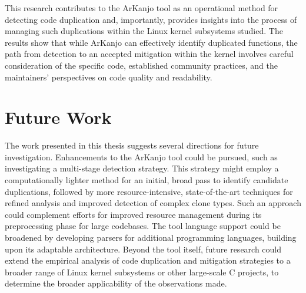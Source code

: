 This research contributes to the ArKanjo tool as an operational method for detecting code 
duplication and, importantly, provides insights into the process of managing such duplications 
within the Linux kernel subsystems studied. The results show that while ArKanjo can effectively 
identify duplicated functions, the path from detection to an accepted mitigation within the kernel 
involves careful consideration of the specific code, established community practices, and the 
maintainers' perspectives on code quality and readability.

\section{Future Work}

The work presented in this thesis suggests several directions for future investigation. Enhancements 
to the ArKanjo tool could be pursued, such as investigating a multi-stage detection strategy. 
This strategy might employ a computationally lighter method for an initial, broad pass to identify 
candidate duplications, followed by more resource-intensive, state-of-the-art techniques for refined 
analysis and improved detection of complex clone types. Such an approach could complement efforts for 
improved resource management during its preprocessing phase for large codebases. The tool language 
support could be broadened by developing parsers for additional programming languages, building upon 
its adaptable architecture. Beyond the tool itself, future research could extend the empirical analysis 
of code duplication and mitigation strategies to a broader range of Linux kernel subsystems or other 
large-scale C projects, to determine the broader applicability of the observations made.
